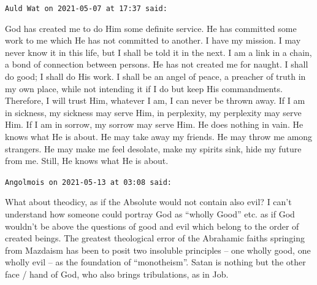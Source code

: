 \begin{footnotesize}
\begin{sffamily}

\texttt{Auld Wat on 2021-05-07 at 17:37 said:}

God has created me to do Him some definite service. He has committed some work to me which He has not committed to another. I have my mission. I may never know it in this life, but I shall be told it in the next. I am a link in a chain, a bond of connection between persons. He has not created me for naught. I shall do good; I shall do His work. I shall be an angel of peace, a preacher of truth in my own place, while not intending it if I do but keep His commandments. Therefore, I will trust Him, whatever I am, I can never be thrown away. If I am in sickness, my sickness may serve Him, in perplexity, my perplexity may serve Him. If I am in sorrow, my sorrow may serve Him. He does nothing in vain. He knows what He is about. He may take away my friends. He may throw me among strangers. He may make me feel desolate, make my spirits sink, hide my future from me. Still, He knows what He is about.


\hfill

\texttt{Angolmois on 2021-05-13 at 03:08 said:}

What about theodicy, as if the Absolute would not contain also evil? I can't understand how someone could portray God as ``wholly Good'' etc. as if God wouldn't be above the questions of good and evil which belong to the order of created beings. The greatest theological error of the Abrahamic faiths springing from Mazdaism has been to posit two insoluble principles -- one wholly good, one wholly evil -- as the foundation of ``monotheism''. Satan is nothing but the other face / hand of God, who also brings tribulations, as in Job.

\hfill

\end{sffamily}
\end{footnotesize}

